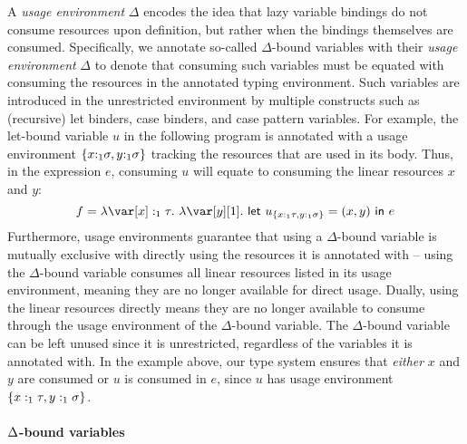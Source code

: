 \documentclass[acmsmall,review,screen]{acmart}
\newcommand{\llet}[2]{\mathsf{let}~#1~\mathsf{in}~#2}
\newcommand{\ROUNDTWO}[1]{{\color{red}#1}}
\begin{document}
A \emph{usage environment} $\Delta$ encodes the idea that lazy
\ROUNDTWO{variable} bindings do not consume resources upon definition, but rather when the bindings themselves are consumed.
Specifically, we annotate so-called $\Delta$-bound variables with \ROUNDTWO{their} \emph{usage
environment} \ROUNDTWO{$\Delta$} to denote that consuming
\ROUNDTWO{such variables must be equated with} consuming the
resources in the annotated \ROUNDTWO{typing} environment.
%
\ROUNDTWO{Such} variables are introduced in the unrestricted environment by
\ROUNDTWO{multiple} constructs such as (recursive) let binders, case binders, and case
pattern variables.
%
For example, the let-bound variable $u$ in the following program is annotated with a
usage environment $\{x{:}_1\sigma,y{:}_1\sigma\}$ tracking the resources that are used in its
body. Thus, in the expression $e$, consuming $u$ will equate to consuming the
linear resources $x$ and $y$:
\[
f = \lambda \x:_1\tau.~\lambda \y[1].~\llet{u_{\{x:_1\tau,y:_1\s\}} = (x,y)}{e}
\]
Furthermore, usage environments guarantee that using a $\Delta$-bound variable
is mutually exclusive with directly using the resources it is annotated with --
using the $\Delta$-bound variable consumes all linear resources listed in its
usage environment, meaning they are no longer available for direct usage.
Dually, using the linear resources directly means they are no longer available
to consume through the usage environment of the $\Delta$-bound variable. The
$\Delta$-bound variable can be left unused since it is unrestricted, regardless
of the variables it is annotated with. \ROUNDTWO{In the example above,
  our type system ensures that \emph{either} $x$ and $y$ are consumed
  or $u$ is consumed in $e$, since $u$ has usage environment $\{x:_1\tau,y:_1\sigma\}$.}

%
%

\paragraph{\texorpdfstring{$\Delta$}{Delta}-bound variables}
\end{document}

